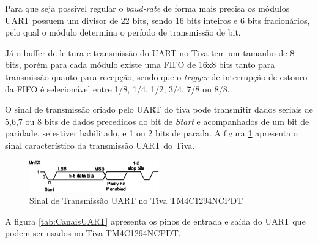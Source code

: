 Para que seja possível regular o \emph{baud-rate} de forma mais precisa os módulos UART possuem um divisor de 22 bits, sendo 16 bits inteiros e 6 bits fracionários, pelo qual o módulo determina o período de transmissão de bit.

Já o buffer de leitura e transmissão do UART no Tiva tem um tamanho de 8 bits, porém para cada módulo existe uma FIFO de 16x8 bits tanto para transmissão quanto para recepção, sendo que o \emph{trigger} de interrupção de estouro da FIFO é selecionável entre 1/8, 1/4, 1/2, 3/4, 7/8 ou 8/8. 

O sinal de transmissão criado pelo UART do tiva pode transmitir dados seriais de 5,6,7 ou 8 bits de dados precedidos do bit de \emph{Start} e acompanhados de um bit de paridade, se estiver habilitado, e 1 ou 2 bits de parada. A figura \ref{fig:uartTiva} apresenta o sinal característico da transmissão UART do Tiva. 

\begin{figure}[H]
	\centering
	\includegraphics[width=0.5\textwidth] {figuras/uartTiva.eps}
	\caption{Sinal de Transmissão UART no Tiva TM4C1294NCPDT}
	\label{fig:uartTiva}
\end{figure}

A figura \ref{tab:CanaisUART} apresenta os pinos de entrada e saída do UART que podem ser usados no Tiva TM4C1294NCPDT.
  
